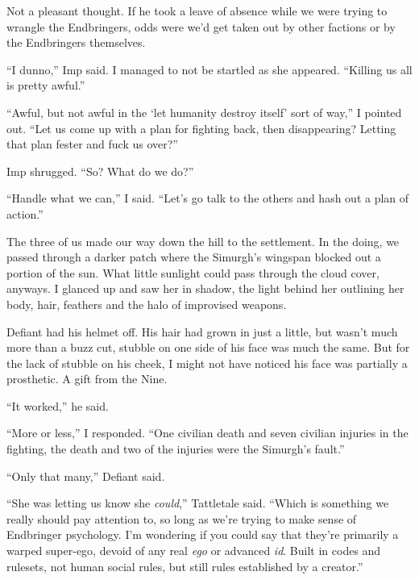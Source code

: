 Not a pleasant thought.  If he took a leave of absence while we were trying to wrangle the Endbringers, odds were we'd get taken out by other factions or by the Endbringers themselves.



``I dunno,'' Imp said.  I managed to not be startled as she appeared.  ``Killing us all is pretty awful.''



``Awful, but not awful in the `let humanity destroy itself' sort of way,'' I pointed out.  ``Let us come up with a plan for fighting back, then disappearing?  Letting that plan fester and fuck us over?''



Imp shrugged.  ``So?  What do we do?''



``Handle what we can,'' I said.  ``Let's go talk to the others and hash out a plan of action.''



The three of us made our way down the hill to the settlement.  In the doing, we passed through a darker patch where the Simurgh's wingspan blocked out a portion of the sun.  What little sunlight could pass through the cloud cover, anyways.  I glanced up and saw her in shadow, the light behind her outlining her body, hair, feathers and the halo of improvised weapons.



Defiant had his helmet off.  His hair had grown in just a little, but wasn't much more than a buzz cut, stubble on one side of his face was much the same.  But for the lack of stubble on his cheek, I might not have noticed his face was partially a prosthetic.  A gift from the Nine.



``It worked,'' he said.



``More or less,'' I responded.  ``One civilian death and seven civilian injuries in the fighting, the death and two of the injuries were the Simurgh's fault.''



``Only that many,'' Defiant said.



``She was letting us know she \emph{could},'' Tattletale said.  ``Which is something we really should pay attention to, so long as we're trying to make sense of Endbringer psychology.  I'm wondering if you could say that they're primarily a warped super-ego, devoid of any real \emph{ego} or advanced \emph{id}.  Built in codes and rulesets, not human social rules, but still rules established by a creator.''



